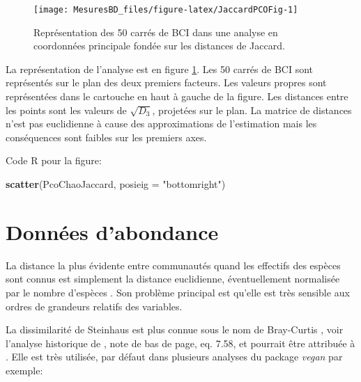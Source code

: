 \documentclass[
  11pt,
  french,
  a4paper,
  extrafontsizes,onecolumn,openright
  ]{memoir}
\newenvironment{Shaded}{\begin{snugshade}}{\end{snugshade}}
\newcommand{\DataTypeTok}[1]{\textcolor[rgb]{0.13,0.29,0.53}{#1}}
\newcommand{\KeywordTok}[1]{\textcolor[rgb]{0.13,0.29,0.53}{\textbf{#1}}}
\newcommand{\NormalTok}[1]{#1}
\newcommand{\StringTok}[1]{\textcolor[rgb]{0.31,0.60,0.02}{#1}}
\begin{document}
\normalsize



\scriptsize

\begin{figure}

{\centering \texttt{[image: MesuresBD\_files/figure-latex/JaccardPCOFig-1]} 

}

\caption{Représentation des 50 carrés de BCI dans une analyse en coordonnées principale fondée sur les distances de Jaccard.}\label{fig:JaccardPCOFig}
\end{figure}

\normalsize

La représentation de l'analyse est en figure \ref{fig:JaccardPCOFig}.
Les 50 carrés de BCI sont représentés sur le plan des deux premiers facteurs.
Les valeurs propres sont représentées dans le cartouche en haut à gauche de la figure.
Les distances entre les points sont les valeurs de \(\sqrt{D_3}\), projetées sur le plan.
La matrice de distances n'est pas euclidienne à cause des approximations de l'estimation mais les conséquences sont faibles sur les premiers axes.

Code R pour la figure:

\scriptsize

\begin{Shaded}
\begin{Highlighting}[]
\KeywordTok{scatter}\NormalTok{(PcoChaoJaccard, }\DataTypeTok{posieig =} \StringTok{"bottomright"}\NormalTok{)}
\end{Highlighting}
\end{Shaded}

\normalsize

\hypertarget{donnuxe9es-dabondance}{%
\section{Données d'abondance}\label{donnuxe9es-dabondance}}

La distance la plus évidente entre communautés quand les effectifs des espèces sont connus est simplement la distance euclidienne, éventuellement normalisée par le nombre d'espèces \autocite[Dissimilarité \(D_1\) de][]{Gower1986}.
Son problème principal est qu'elle est très sensible aux ordres de grandeurs relatifs des variables.

La dissimilarité de Steinhaus \autocite{Motyka1947} est plus connue sous le nom de Bray-Curtis \autocite{Odum1950,Bray1957}, voir l'analyse historique de \textcite{Legendre2012}, note de bas de page, eq. 7.58, et pourrait être attribuée à \textcite{Renkonen1938}.
Elle est très utilisée, par défaut dans plusieurs analyses du package \emph{vegan} par exemple:
\end{document}
